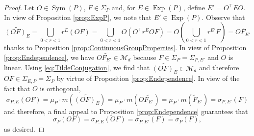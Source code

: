 \documentclass[11pt]{article}
\theoremstyle{remark}
\newcommand\Sym{\operatorname{Sym}}
\newcommand\Exp{\operatorname{Exp}}
\begin{document}
\begin{proof}
Let $O\in\Sym(P)$, $F\in\Sigma_P$ and, for $E\in \Exp(P)$, define $E'=O^\top EO$. In view of Proposition \ref{prop:ExpP}, we note that $E'\in \Exp(P)$. Observe that
\begin{equation}\label{eq:TildeConjugation}
    \widetilde{(OF)_E}=\bigcup_{0<r<1}r^E (OF)=\bigcup_{0<r<1}O\left(O^\top r^E O F\right)=O\left(\bigcup_{0<r<1} r^{E'}F\right)=O \widetilde{F_{E'}}
\end{equation}
thanks to Proposition \ref{prop:ContinuousGroupProperties}.
In view of Proposition \ref{prop:Endependence}, we have $O\widetilde{F_{E'}}\in \mathcal{M}_d$ because $F\in \Sigma_P=\Sigma_{P,E'}$ and $O$ is linear. Using \eqref{eq:TildeConjugation}, we find that $\widetilde{(OF)_E}\in\mathcal{M}_d$ and therefore  $OF\in\Sigma_{E,P}=\Sigma_P$ by virtue of Proposition \ref{prop:Endependence}. In view of the fact that $O$ is orthogonal,
\begin{equation*}
\sigma_{P,E}(OF)=\mu_P\cdot m\left(\widetilde{(OF)_E}\right)=\mu_P\cdot m\left(O \widetilde{F_{E'}}\right)=\mu_P\cdot m\left(\widetilde{F}_{E'}\right)=\sigma_{P,E'}(F)
\end{equation*}
and therefore, a final appeal to Proposition \ref{prop:Endependence} guarantees that
\begin{equation*}
    \sigma_P(OF)=\sigma_{P,E}(OF)=\sigma_{P,E'}(F)=\sigma_P(F),
\end{equation*}
as desired.

\end{proof}
\end{document}
